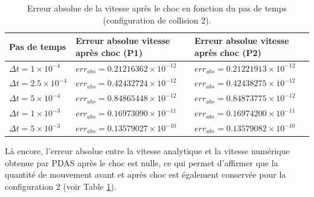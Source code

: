 \begin{center}
\begin{table}[!h]
\begin{tabular}{ |p{2.7cm}|p{4.9cm}|p{4.9cm}| }

 \hline  \rowcolor{lightgray}
 Pas de temps & Erreur absolue vitesse après choc (P1) & Erreur absolue vitesse après choc (P2)\\
 \hline
 $\Delta t = 1\times10^{-4}$ & $err_{abs} = 0.21216362\times10^{-12}$ & $err_{abs} = 0.21221913\times10^{-12}$\\
 $\Delta t = 2.5\times10^{-4}$ & $err_{abs} = 0.42432724\times10^{-12}$ & $err_{abs} = 0.42438275\times10^{-12}$\\
 $\Delta t = 5\times10^{-4}$ & $err_{abs} = 0.84865448\times10^{-12}$ & $err_{abs} = 0.84873775\times10^{-12}$\\
 $\Delta t = 1\times10^{-3}$ & $err_{abs} = 0.16973090\times10^{-11}$ & $err_{abs} = 0.16974200\times10^{-11}$\\
 $\Delta t = 5\times10^{-3}$ & $err_{abs} = 0.13579027\times10^{-10}$ & $err_{abs} = 0.13579082\times10^{-10}$\\
 \hline
\end{tabular}
\caption{Erreur absolue de la vitesse après le choc en fonction du pas de temps (configuration de collision 2).}\label{tab4}
\end{table}
\end{center}

Là encore, l'erreur absolue entre la vitesse analytique et la vitesse numérique obtenue par PDAS après le choc est nulle, ce qui permet d'affirmer que la quantité de mouvement avant et après choc est également conservée pour la configuration 2 (voir Table \ref{tab4}). 

